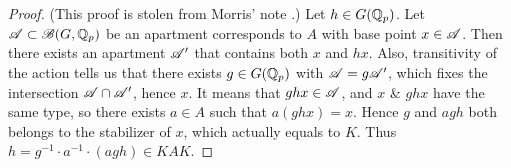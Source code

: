 \begin{proof}
(This proof is stolen from Morris' note \cite{morrisintroduction}.)
Let $h \in G(\mathbb{Q}_p)$.
Let $\mathscr{A} \subset \mathscr{B}(G, \mathbb{Q}_p)$ be an apartment corresponds to $A$ with base point $x \in \mathscr{A}$.
Then there exists an apartment $\mathscr{A}'$ that contains both $x$ and $hx$.
Also, transitivity of the action tells us that there exists $g \in G(\mathbb{Q}_p)$ with $\mathscr{A} = g\mathscr{A}'$, which fixes the intersection $\mathscr{A} \cap \mathscr{A}'$, hence $x$.
It means that $ghx \in \mathscr{A}$, and $x$ \& $ghx$ have the same type, so there exists $a \in A$ such that $a(ghx) = x$.
Hence $g$ and $agh$ both belongs to the stabilizer of $x$, which actually equals to $K$.
Thus $h = g^{-1} \cdot a^{-1} \cdot (agh) \in KAK$.
\end{proof}